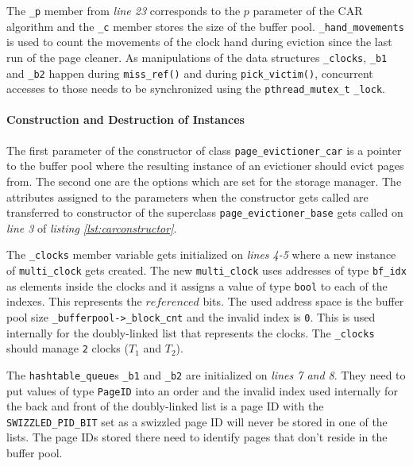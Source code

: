 	The \lstinline{_p} member from \emph{line 23} corresponds to the $p$ parameter of the CAR algorithm and the \lstinline{_c} member stores the size of the buffer pool. \lstinline{_hand_movements} is used to count the movements of the clock hand during eviction since the last run of the page cleaner. As manipulations of the data structures \lstinline{_clocks}, \lstinline{_b1} and \lstinline{_b2} happen during \lstinline{miss_ref()} and during \lstinline{pick_victim()}, concurrent accesses to those needs to be synchronized using the \lstinline{pthread_mutex_t} \lstinline{_lock}.

\paragraph{Construction and Destruction of Instances}

\begin{@empty}
	\lstset{
		language = [ISO]C++,
		style = basic
	}
	\begin{code}[ht!]
		\caption{Constructor and Destructor of the Class \lstinline{page_evictioner_car}} \label{lst:carconstructor}
		
	\end{code}
\end{@empty}

	The first parameter of the constructor of class \lstinline{page_evictioner_car} is a pointer to the buffer pool where the resulting instance of an evictioner should evict pages from. The second one are the options which are set for the storage manager. The attributes assigned to the parameters when the constructor gets called are transferred to constructor of the superclass \lstinline{page_evictioner_base} gets called on \emph{line 3} of \emph{listing \ref{lst:carconstructor}}.
	
	The \lstinline{_clocks} member variable gets initialized on \emph{lines 4-5} where a new instance of \lstinline{multi_clock} gets created. The new \lstinline{multi_clock} uses addresses of type \lstinline{bf_idx} as elements inside the clocks and it assigns a value of type \lstinline{bool} to each of the indexes. This represents the $referenced$ bits. The used address space is the buffer pool size \lstinline{_bufferpool->_block_cnt} and the invalid index is \lstinline{0}. This is used internally for the doubly-linked list that represents the clocks. The \lstinline{_clocks} should manage \lstinline{2} clocks ($T_1$ and $T_2$).
	
	The \lstinline{hashtable_queue}s \lstinline{_b1} and \lstinline{_b2} are initialized on \emph{lines 7 and 8}. They need to put values of type \lstinline{PageID} into an order and the invalid index used internally for the back and front of the doubly-linked list is a page ID with the \lstinline{SWIZZLED_PID_BIT} set as a swizzled page ID will never be stored in one of the lists. The page IDs stored there need to identify pages that don't reside in the buffer pool.
	
